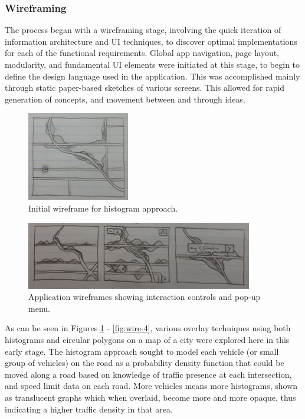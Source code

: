 \documentclass{report}
\begin{document}
\subsubsection{Wireframing}
The process began with a wireframing stage, involving the quick iteration of information architecture and UI techniques, to discover optimal implementations for each of the functional requirements.
Global app navigation, page layout, modularity, and fundamental UI elements were initiated at this stage, to begin to define the design language used in the application.
This was accomplished mainly through static paper-based sketches of various screens.
This allowed for rapid generation of concepts, and movement between and through ideas. 

\begin{figure}[htbp!]
  \begin{centering}
    \includegraphics[scale=1]{figures/wire-1.png}
    \caption{Initial wireframe for histogram approach.}
    \label{fig:wire-1}
  \end{centering}
\end{figure}

\begin{figure}[htbp!]
  \begin{centering}
    \includegraphics[scale=1]{figures/wire-2.png}
    \caption{Application wireframes showing interaction controls and pop-up menu.}
    \label{fig:wire-2}
  \end{centering}
\end{figure}

As can be seen in Figures \ref{fig:wire-1} - \ref{fig:wire-4}, various overlay techniques using both histograms and circular polygons on a map of a city were explored here in this early stage.
The histogram approach sought to model each vehicle (or small group of vehicles) on the road as a probability density function that could be moved along a road based on knowledge of traffic presence at each intersection, and speed limit data on each road.
More vehicles means more histograms, shown as translucent graphs which when overlaid, become more and more opaque, thus indicating a higher traffic density in that area.
\end{document}
